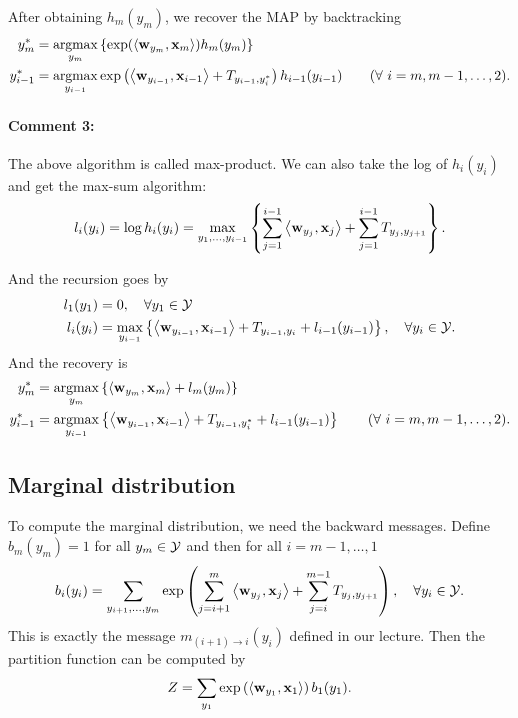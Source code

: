 \documentclass[11pt]{report}
\begin{document}
	After obtaining $h_m(y_m)$, we recover the MAP by backtracking
	\begin{align}
		y^*_m &= \operatorname*{\mathrm{argmax}}_{y_m} \left\{ \exp(\left\langle \mathbf{\boldsymbol{w}}_{y_m},\mathbf{\boldsymbol{x}}_m \right\rangle) h_m(y_m)\right\} \\
		y^*_{i-1} &= \operatorname*{\mathrm{argmax}}_{y_{i-1}} \exp \left(\left\langle \mathbf{\boldsymbol{w}}_{y_{i-1}},\mathbf{\boldsymbol{x}}_{i-1} \right\rangle + T_{y_{i-1}, y^*_i}\right)  h_{i-1}(y_{i-1})  \qquad (\forall\ i = m, m-1, \ldots, 2).
	\end{align}
	
	\paragraph{Comment 3:}
	The above algorithm is called max-product.
	We can also take the log of $h_i(y_i)$ and get the max-sum algorithm:
	\begin{align}
		l_i(y_i) = \log h_i(y_i) = \max_{y_1, \ldots, y_{i-1}} \left\{\sum_{j=1}^{i-1} \left\langle \mathbf{\boldsymbol{w}}_{y_j},\mathbf{\boldsymbol{x}}_j \right\rangle + \sum_{j=1}^{i-1} T_{y_j, y_{j+1}}\right\}.
	\end{align}
	
	And the recursion goes by
	\begin{align}
		l_1(y_1) &= 0, \quad \forall y_1 \in \mathcal{Y} \\
		l_i(y_i) &= \max_{y_{i-1}} \left\{\left\langle \mathbf{\boldsymbol{w}}_{y_{i-1}},\mathbf{\boldsymbol{x}}_{i-1} \right\rangle + T_{y_{i-1}, y_i} + l_{i-1}(y_{i-1})\right\}, \quad \forall y_i \in \mathcal{Y}.
	\end{align}
	And the recovery is
	\begin{align}
		y^*_m &= \operatorname*{\mathrm{argmax}}_{y_m} \left\{ \left\langle \mathbf{\boldsymbol{w}}_{y_m},\mathbf{\boldsymbol{x}}_m \right\rangle + l_m(y_m)\right\} \\
		y^*_{i-1} &= \operatorname*{\mathrm{argmax}}_{y_{i-1}} \left\{ \left\langle \mathbf{\boldsymbol{w}}_{y_{i-1}},\mathbf{\boldsymbol{x}}_{i-1} \right\rangle + T_{y_{i-1}, y^*_i} + l_{i-1}(y_{i-1})\right\}  \qquad (\forall\ i = m, m-1, \ldots, 2).
	\end{align}
	
	\subsection{Marginal distribution}
	\label{sec:marginal}
	
	To compute the marginal distribution, we need the backward messages.
	Define $b_m(y_m) = 1$ for all $y_m \in \mathcal{Y}$ and then for all $i = m-1, \ldots, 1$
	\begin{align}
		b_i(y_i) = \sum_{y_{i+1}, \ldots, y_{m}} \exp \left(\sum_{j=i+1}^m \left\langle \mathbf{\boldsymbol{w}}_{y_j},\mathbf{\boldsymbol{x}}_j \right\rangle + \sum_{j=i}^{m-1} T_{y_j, y_{j+1}}\right), \quad \forall y_i \in \mathcal{Y}.
	\end{align}
	This is exactly the message $m_{(i+1) \to i} (y_i)$ defined in our lecture.
	Then the partition function can be computed by
	\begin{align}
		Z = \sum_{y_1} \exp \left(\left\langle \mathbf{\boldsymbol{w}}_{y_1},\mathbf{\boldsymbol{x}}_1 \right\rangle\right) b_1(y_1).
	\end{align}
	
\end{document}
